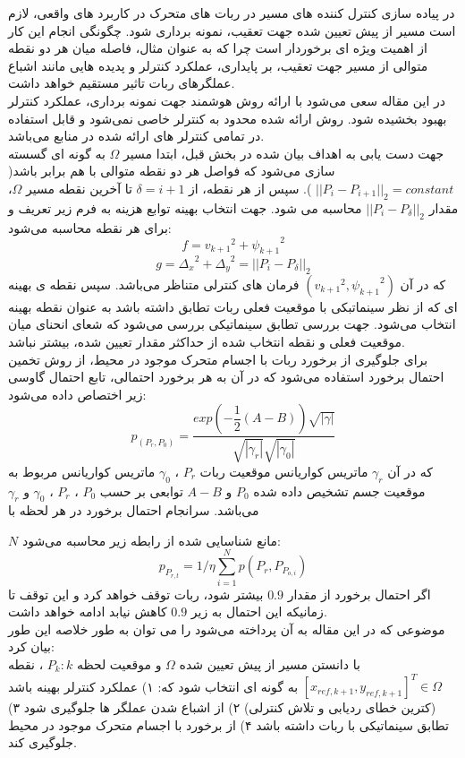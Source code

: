 در پیاده سازی کنترل کننده های مسیر در ربات های متحرک در کاربرد های واقعی، لازم است مسیر از پیش تعیین شده جهت تعقیب، نمونه برداری شود. چگونگی انجام این کار از اهمیت ویژه ای برخوردار است چرا که به عنوان مثال، فاصله میان هر دو نقطه متوالی از مسیر جهت تعقیب، بر پایداری، عملکرد کنترلر و پدیده هایی مانند اشباع عملگرهای ربات تاثیر مستقیم خواهد داشت.\\
در این مقاله سعی می‌شود با ارائه روش هوشمند جهت نمونه برداری، عملکرد کنترلر بهبود بخشیده شود. روش ارائه شده محدود به کنترلر خاصی نمی‌شود و قابل استفاده در تمامی کنترلر های ارائه شده در منابع می‌باشد.\\

جهت دست یابی به اهداف بیان شده در بخش قبل، ابتدا مسیر 
$
\Omega
$
به گونه ای گسسته سازی می‌شود که فواصل هر دو نقطه متوالی با هم برابر باشد(
$
||P_i - P_{i+1}||_2 = constant
$
).
سپس از هر نقطه، از 
$
\delta = i+1
$
تا آخرین نقطه مسیر 
$
\Omega
$،
مقدار 
$
||P_i - P_{\delta}||_2
$
محاسبه می شود. جهت انتخاب بهینه توابع هزینه به فرم زیر تعریف و برای هر نقطه محاسبه می‌شود:
\begin{equation}
	f = {v_{k+1}}^2 + {\psi_{k+1}}^2  
\end{equation}
\begin{equation}
	g = {\Delta_{x}}^2 + {\Delta_{y}}^2 = ||P_i - P_{\delta}||_2
\end{equation}
که در آن 
$
({v_{k+1}}^2 , {\psi_{k+1}}^2)
$
فرمان های کنترلی متناظر می‌باشد. 
سپس نقطه ی بهینه ای که از نظر سینماتبکی با موقعیت فعلی ربات تطابق داشته باشد به عنوان نقطه بهینه انتخاب می‌شود. جهت بررسی تطابق سینماتیکی بررسی می‌شود که شعای انحنای میان موقعیت فعلی و نقطه انتخاب شده از حداکثر مقدار تعیین شده، بیشتر نباشد.\\
برای جلوگیری از برخورد ربات با اجسام متحرک موجود در محیط، از روش تخمین احتمال برخورد استفاده می‌شود که در آن به هر برخورد احتمالی، تابع احتمال گاوسی زیر اختصاص داده می‌شود:
\begin{equation}
	{p}_{(P_r,P_0)}=\dfrac{exp(-\dfrac{1}{2}(A-B))\sqrt{|\gamma|}}{\sqrt{|\gamma_r|}\sqrt{|\gamma_0|}}
\end{equation}  
که در آن 
$
\gamma_r
$
ماتریس کواریانس موقعیت ربات
$
P_r
$
،
$
\gamma_0
$
ماتریس کواریانس مربوط به موقعیت جسم تشخیص داده شده
$
P_0
$
و 
$
A-B
$
توابعی بر حسب 
$P_0$
،
$P_r$
،
$\gamma_0$
و
$
\gamma_r
$
می‌باشد. سرانجام احتمال برخورد در هر لحظه با 

$
N
$
مانع شناسایی شده 
از رابطه زیر محاسبه می‌شود:
\begin{equation}
	{p}_{P_{r,t}}=1/\eta \sum_{i=1}^{N} p(P_r,P_{P_{o,i}})
\end{equation} 
اگر احتمال برخورد از مقدار 
$
0.9
$
بیشتر شود، ربات توقف خواهد کرد و این توقف تا زمانیکه این احتمال به زیر 
$
0.9
$
کاهش نیابد ادامه خواهد داشت.\\
موضوعی که در این مقاله به آن پرداخته می‌شود را می توان به طور خلاصه این طور بیان کرد:\\
با دانستن مسیر از پیش تعیین شده 
$
\Omega
$
و موقعیت لحظه 
$
P_k : k
$
، نقطه 
$
[x_{ref,k+1}, y_{ref,k+1}]^T \in \Omega
$
به گونه ای انتخاب شود که: ۱) عملکرد کنترلر بهینه باشد (کترین خطای ردیابی و تلاش کنترلی) ۲) از اشباع شدن عملگر ها جلوگیری شود ۳) تطابق سینماتیکی با ربات داشته باشد ۴) از برخورد با اجسام متحرک موجود در محیط جلوگیری کند.
